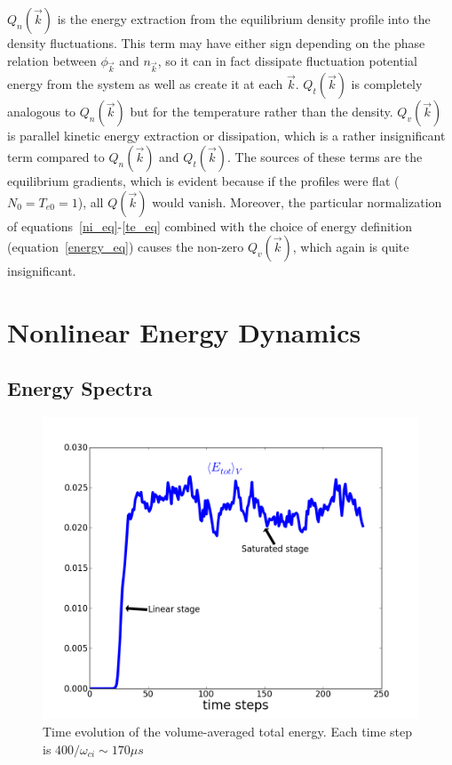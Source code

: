 \documentclass[showpacs,preprintnumbers,amsmath,amssymb,superscriptaddress]{revtex4}
\begin{document}
$Q_n(\vec{k})$ is the energy extraction from the equilibrium density profile into the density fluctuations. 
This term may have either sign depending on the phase relation between $\phi_{\vec{k}}$ and $n_{\vec{k}}$, 
so it can in fact dissipate fluctuation potential energy from the system as well as create it
at each $\vec{k}$. $Q_t(\vec{k})$ is completely analogous to $Q_n(\vec{k})$ but for the temperature rather than the density. 
$Q_v(\vec{k})$ is parallel kinetic energy extraction or dissipation, which is a rather insignificant term compared to $Q_n(\vec{k})$ and $Q_t(\vec{k})$.
The sources of these terms are the equilibrium gradients, which is evident because if the profiles
were flat ($N_0=T_{e0}=1$), all $Q(\vec{k})$ would vanish.
Moreover, the particular normalization of equations~\ref{ni_eq}-\ref{te_eq} combined with the choice of energy definition (equation~\ref{energy_eq}) causes the non-zero $Q_v(\vec{k})$, which again
is quite insignificant.


\section{Nonlinear Energy Dynamics}
\label{nl_en_dynamics_sec}

\subsection{Energy Spectra}

\begin{figure}[!htbp]
\includegraphics[]{time_evolution}
\hfil
\caption{Time evolution of the volume-averaged total energy. Each time step is $400/\omega_{ci} \sim 170 \mu s$}
\label{time_evolution}
\end{figure}
\end{document}
